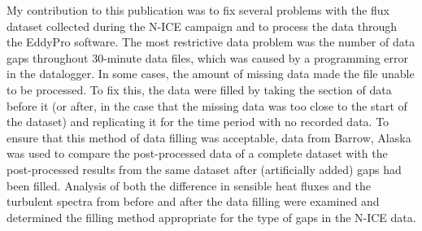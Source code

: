 My contribution to this publication was to fix several problems with the flux dataset collected during the N-ICE campaign and to process the data through the EddyPro software. The most restrictive data problem was the number of data gaps throughout 30-minute data files, which was caused by a programming error in the datalogger. In some cases, the amount of missing data made the file unable to be processed. To fix this, the data were filled by taking the section of data before it (or after, in the case that the missing data was too close to the start of the dataset) and replicating it for the time period with no recorded data. To ensure that this method of data filling was acceptable, data from Barrow, Alaska was used to compare the post-processed data of a complete dataset with the post-processed results from the same dataset after (artificially added) gaps had been filled. Analysis of both the difference in sensible heat fluxes and the turbulent spectra from before and after the data filling were examined and determined the filling method appropriate for the type of gaps in the N-ICE data. 